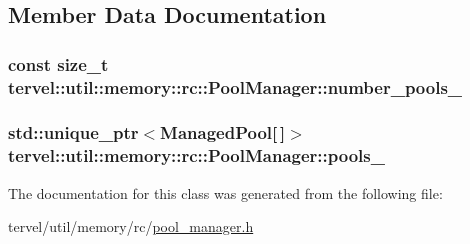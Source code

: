 \subsection{Member Data Documentation}
\hypertarget{classtervel_1_1util_1_1memory_1_1rc_1_1_pool_manager_aabebb2e05664becf83a3f494160a721f}{}
\subsubsection[{number\+\_\+pools\+\_\+}]{\setlength{\rightskip}{0pt plus 5cm}const size\+\_\+t tervel\+::util\+::memory\+::rc\+::\+Pool\+Manager\+::number\+\_\+pools\+\_\+}\label{classtervel_1_1util_1_1memory_1_1rc_1_1_pool_manager_aabebb2e05664becf83a3f494160a721f}
\hypertarget{classtervel_1_1util_1_1memory_1_1rc_1_1_pool_manager_a69430218cf6f7b1dac677ae64f14f77c}{}
\subsubsection[{pools\+\_\+}]{\setlength{\rightskip}{0pt plus 5cm}std\+::unique\+\_\+ptr$<${\bf Managed\+Pool}\mbox{[}$\,$\mbox{]}$>$ tervel\+::util\+::memory\+::rc\+::\+Pool\+Manager\+::pools\+\_\+\hspace{0.3cm}{\ttfamily [private]}}\label{classtervel_1_1util_1_1memory_1_1rc_1_1_pool_manager_a69430218cf6f7b1dac677ae64f14f77c}


The documentation for this class was generated from the following file\+:\begin{DoxyCompactItemize}
\item 
tervel/util/memory/rc/\hyperlink{pool__manager_8h}{pool\+\_\+manager.\+h}\end{DoxyCompactItemize}
